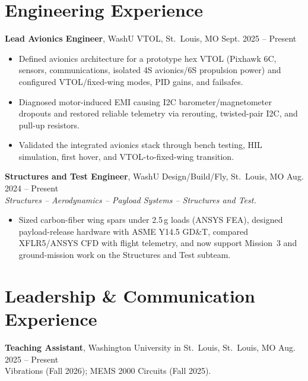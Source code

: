 \documentclass[11pt, letterpaper]{article}
\newcommand{\role}[5]{%
  \noindent\textbf{#1}, #2, #3, #4 \hfill #5%
}
\begin{document}
\section{Engineering Experience}
\role{Lead Avionics Engineer}{WashU VTOL}{St.\ Louis}{MO}{Sept. 2025 -- Present}
\begin{itemize}
\item Defined avionics architecture for a prototype hex VTOL (Pixhawk 6C, sensors, communications, isolated 4S avionics/6S propulsion power) and configured VTOL/fixed-wing modes, PID gains, and failsafes.
\item Diagnosed motor-induced EMI causing I2C barometer/magnetometer dropouts and restored reliable telemetry via rerouting, twisted-pair I2C, and pull-up resistors.
\item Validated the integrated avionics stack through bench testing, HIL simulation, first hover, and VTOL-to-fixed-wing transition.
\end{itemize}
\role{Structures and Test Engineer}{WashU Design/Build/Fly}{St.\ Louis}{MO}{Aug. 2024 -- Present} \\[-2pt]
\textit{\small Structures -- Aerodynamics -- Payload Systems -- Structures and Test.}
\begin{itemize}
\item Sized carbon-fiber wing spars under 2.5\,g loads (ANSYS FEA), designed payload-release hardware with ASME Y14.5 GD\&T, compared XFLR5/ANSYS CFD with flight telemetry, and now support Mission~3 and ground-mission work on the Structures and Test subteam.
\end{itemize}
\section{Leadership \& Communication Experience}
\role{Teaching Assistant}{Washington University in St.\ Louis}{St.\ Louis}{MO}{Aug. 2025 -- Present}\\[-1pt]
{\small Vibrations (Fall 2026); MEMS 2000 Circuits (Fall 2025).}
\end{document}
